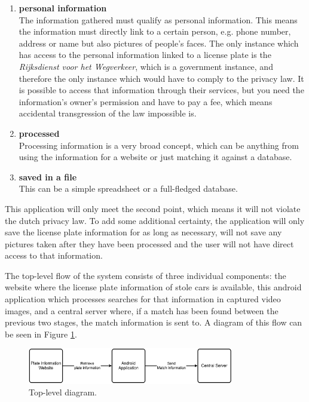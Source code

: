 \begin{enumerate}
    \item{\textbf{personal information} \\
        The information gathered must qualify as personal information. This means the information must directly link to a certain person, e.g. phone number, address or name but also pictures of people's faces. The only instance which has access to the personal information linked to a license plate is the \textit{Rijksdienst voor het Wegverkeer}, which is a government instance, and therefore the only instance which would have to comply to the privacy law. It is possible to access that information through their services, but you need the information's owner's permission and have to pay a fee, which means accidental transgression of the law impossible is.
    }

    \item{\textbf{processed} \\
        Processing information is a very broad concept, which can be anything from using the information for a website or just matching it against a database.
    }

    \item{\textbf{saved in a file} \\
        This can be a simple spreadsheet or a full-fledged database.
    }
\end{enumerate}

This application will only meet the second point, which means it will not violate the dutch privacy law. To add some additional certainty, the application will only save the license plate information for as long as necessary, will not save any pictures taken after they have been processed and the user will not have direct access to that information.

The top-level flow of the system consists of three individual components: the website where the license plate information of stole cars is available, this android application which processes searches for that information in captured video images, and a central server where, if a match has been found between the previous two stages, the match information is sent to. A diagram of this flow can be seen in Figure \ref{fig:top-level}.

\begin{figure}[ht]
    \centering
    \includegraphics[width=0.8\textwidth]{plaatjes/top-down}
    \caption{Top-level diagram.}
    \label{fig:top-level}
\end{figure}%

